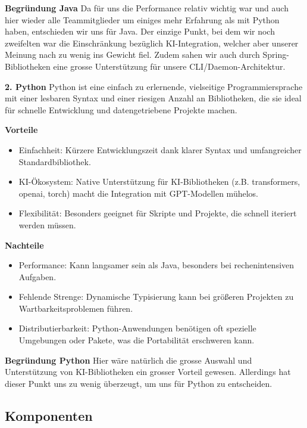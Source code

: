 \documentclass[a4paper,12pt]{report}
\begin{document}
    \textbf{Begründung Java} Da für uns die Performance relativ wichtig war und auch hier wieder alle
    Teammitglieder um einiges mehr Erfahrung als mit Python haben, entschieden wir uns für Java.
    Der einzige Punkt, bei dem wir noch zweifelten war die Einschränkung bezüglich KI-Integration,
    welcher aber unserer Meinung nach zu wenig ins Gewicht fiel.
    Zudem sahen wir auch durch Spring-Bibliotheken eine grosse Unterstützung für unsere CLI/Daemon-Architektur.

    \textbf{2. Python}
    Python ist eine einfach zu erlernende, vielseitige Programmiersprache mit einer lesbaren Syntax
    und einer riesigen Anzahl an Bibliotheken, die sie ideal für schnelle Entwicklung
    und datengetriebene Projekte machen.

    \textbf{Vorteile}
    \begin{itemize}
        \item Einfachheit: Kürzere Entwicklungszeit dank klarer Syntax und umfangreicher Standardbibliothek.
        \item KI-Ökosystem: Native Unterstützung für KI-Bibliotheken (z.B. transformers, openai, torch) macht die Integration mit GPT-Modellen mühelos.
        \item Flexibilität: Besonders geeignet für Skripte und Projekte, die schnell iteriert werden müssen.
    \end{itemize}

    \textbf{Nachteile}
    \begin{itemize}
        \item Performance: Kann langsamer sein als Java, besonders bei rechenintensiven Aufgaben.
        \item Fehlende Strenge: Dynamische Typisierung kann bei größeren Projekten zu Wartbarkeitsproblemen führen.
        \item Distributierbarkeit: Python-Anwendungen benötigen oft spezielle Umgebungen oder Pakete, was die Portabilität erschweren kann.
    \end{itemize}

    \textbf{Begründung Python} Hier wäre natürlich die grosse Auswahl und Unterstützung von KI-Bibliotheken ein grosser Vorteil gewesen.
    Allerdings hat dieser Punkt uns zu wenig überzeugt, um uns für Python zu entscheiden.


    \clearpage
    \subsection{Komponenten}\label{subsec:komponenten}
\end{document}
